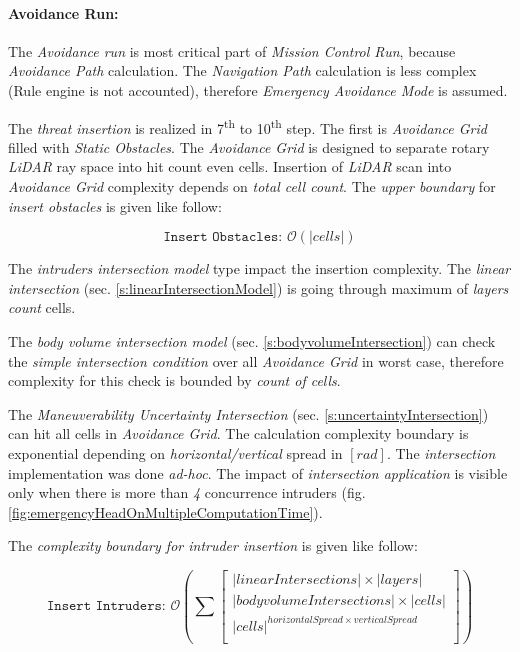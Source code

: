 \paragraph{Avoidance Run:} The \emph{Avoidance run} is most critical part of \emph{Mission Control Run}, because \emph{Avoidance Path} calculation. The \emph{Navigation Path} calculation is less complex (Rule engine is not accounted), therefore \emph{Emergency Avoidance Mode} is assumed. 

The \emph{threat insertion} is realized in 7\textsuperscript{th} to 10\textsuperscript{th} step. The first is \emph{Avoidance Grid} filled with \emph{Static Obstacles}. The \emph{Avoidance Grid} is designed to separate rotary  \emph{LiDAR} ray space into hit count even cells. Insertion of \emph{LiDAR} scan into \emph{Avoidance Grid} complexity depends on \emph{total cell count}. The \emph{upper boundary} for \emph{insert obstacles} is given like follow:

\begin{equation*}
    \texttt{Insert Obstacles: } \mathscr{O}(|cells|)
\end{equation*}

\noindent The \emph{intruders intersection model} type impact the insertion complexity. The \emph{linear intersection} (sec. \ref{s:linearIntersectionModel}) is going through maximum of \emph{layers count} cells. 

The \emph{body volume intersection model} (sec. \ref{s:bodyvolumeIntersection}) can check the \emph{simple intersection condition} over all \emph{Avoidance Grid} in worst case, therefore complexity for this check is bounded by \emph{count of cells}. 

The \emph{Maneuverability Uncertainty Intersection} (sec. \ref{s:uncertaintyIntersection}) can hit all cells in \emph{Avoidance Grid}. The calculation complexity boundary is exponential depending on \emph{horizontal/vertical} spread in $[rad]$. The \emph{intersection} implementation was done \emph{ad-hoc}. The impact of \emph{intersection application} is visible only when there is more than \emph{4} concurrence intruders (fig. \ref{fig:emergencyHeadOnMultipleComputationTime}).

\noindent The \emph{complexity boundary for \emph{intruder insertion}} is given like follow:

\begin{equation*}
    \texttt{Insert Intruders: }
    \mathscr{O}\left(\sum \begin{bmatrix}
        |linear Intersections| \times |layers|\\
        |body volume Intersections| \times  |cells|\\
        |cells|^{horizontal Spread \times vertical Spread}\\
    \end{bmatrix}\right)
\end{equation*}

